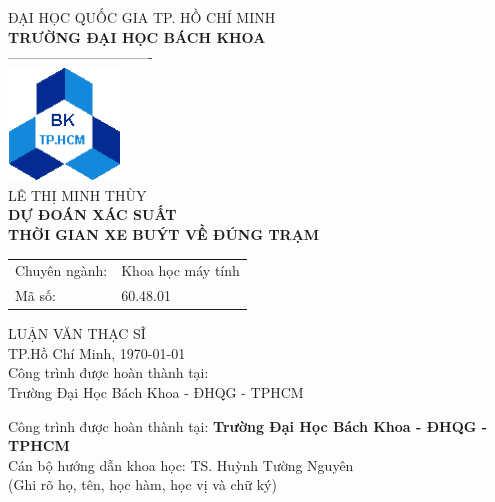 \documentclass[a4paper, 13pt]{report}
\begin{document}
\newpage
{}  %
	\thisfancypage{
		\doublebox}
	{}
	
	\begin{center}
		\vspace*{0.2cm}
		ĐẠI HỌC QUỐC GIA TP. HỒ CHÍ MINH\\
		{\fontsize{14pt}{1}\textbf{		TRƯỜNG ĐẠI HỌC BÁCH KHOA }}\\
		-------------------------------\\
		\includegraphics[width=3cm]{images/bk}\\
		\vspace*{2cm}
		{\fontsize{14pt}{1}\selectfont LÊ THỊ MINH THÙY}\\
		\vspace*{2cm}
		{\fontsize{16pt}{1}\selectfont \textbf{DỰ ĐOÁN XÁC SUẤT \\ THỜI GIAN XE BUÝT VỀ ĐÚNG TRẠM}}\\
		\vspace*{2cm}
		\begin{flushleft}
		\large
		\begin{tabular}{ ll } 
        \hspace{1cm} Chuyên ngành: & Khoa học máy tính\\
		\hspace{1cm} Mã số: & 60.48.01\\
		\end{tabular}
		\end{flushleft}
		\vspace*{2cm}
		{\fontsize{14pt}{1}\selectfont LUẬN VĂN THẠC SĨ}\\
		\vspace*{2cm}
		{\fontsize{12pt}{1}	TP.Hồ Chí Minh, \today}\\
		\vspace*{2cm}
		{\fontsize{12pt}{1}	Công trình được hoàn thành tại:\\ Trường Đại Học Bách Khoa - ĐHQG - TPHCM}
	\end{center}
\pagebreak
Công trình được hoàn thành tại: \textbf{Trường Đại Học Bách Khoa - ĐHQG - TPHCM}\\
Cán bộ hướng dẫn khoa học: TS. Huỳnh Tường Nguyên	\\
	(Ghi rõ họ, tên, học hàm, học vị và chữ  ký)\\
\end{document}
